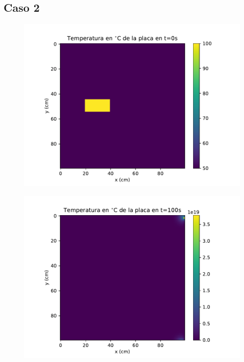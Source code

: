 \documentclass[12pt,letterpaper]{article}
\begin{document}
\subsection*{Caso 2}

\begin{figure}[H]
\includegraphics{a2_0.pdf}
\centering
\end{figure}

\begin{figure}[H]
\includegraphics{a2_100.pdf}
\centering
\end{figure}
\end{document}

